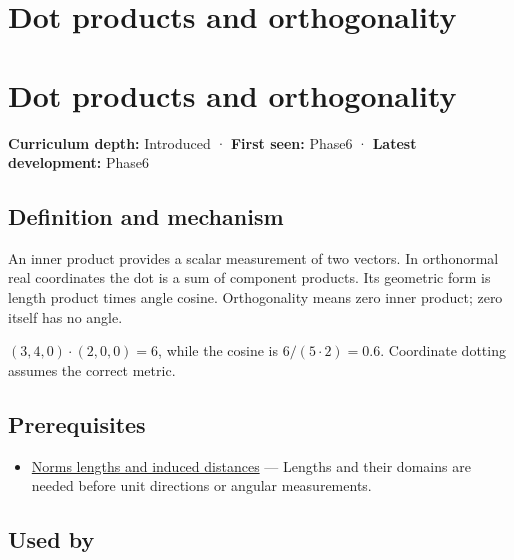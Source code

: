 \hypertarget{appendix-8bc4e8fc547c}{}
\section*{Dot products and orthogonality}
\section{Dot products and orthogonality}\label{appendix-8bc4e8fc547c-dot-products-and-orthogonality}

\textbf{Curriculum depth:} Introduced · \textbf{First seen:} Phase6 · \textbf{Latest development:} Phase6

\subsection{Definition and mechanism}\label{appendix-8bc4e8fc547c-definition-and-mechanism}

An inner product provides a scalar measurement of two vectors. In orthonormal real coordinates the dot is a sum of component products. Its geometric form is length product times angle cosine. Orthogonality means zero inner product; zero itself has no angle.

\((3,4,0)\cdot(2,0,0)=6\), while the cosine is \(6/(5\cdot2)=0.6\). Coordinate dotting assumes the correct metric.

\subsection{Prerequisites}\label{appendix-8bc4e8fc547c-prerequisites}

\begin{itemize}
\tightlist
\item
  \hyperref[appendix-49933872bb51]{Norms lengths and induced distances} --- Lengths and their domains are needed before unit directions or angular measurements.
\end{itemize}

\subsection{Used by}\label{appendix-8bc4e8fc547c-used-by}

